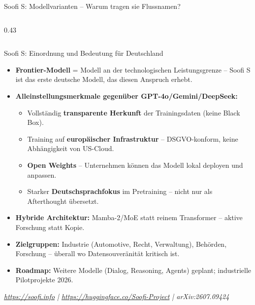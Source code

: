 \documentclass[aspectratio=1610, xcolor=dvipsnames, 9pt]{beamer}
\begin{document}
\begin{frame}{Soofi S: Modellvarianten -- Warum tragen sie Flussnamen?}
\begin{columns}
\begin{column}{0.43\textwidth}
    \end{column}
  \end{columns}
\end{frame}

\begin{frame}{Soofi S: Einordnung und Bedeutung für Deutschland}
  \begin{itemize}
    \item \textbf{Frontier-Modell} = Modell an der technologischen Leistungsgrenze -- Soofi S ist das erste deutsche Modell, das diesen Anspruch erhebt.
    \item \textbf{Alleinstellungsmerkmale gegenüber GPT-4o/Gemini/DeepSeek:}
      \begin{itemize}
        \item Vollständig \textbf{transparente Herkunft} der Trainingsdaten (keine Black Box).
        \item Training auf \textbf{europäischer Infrastruktur} -- DSGVO-konform, keine Abhängigkeit von US-Cloud.
        \item \textbf{Open Weights} -- Unternehmen können das Modell lokal deployen und anpassen.
        \item Starker \textbf{Deutschsprachfokus} im Pretraining -- nicht nur als Afterthought übersetzt.
      \end{itemize}
    \item \textbf{Hybride Architektur:} Mamba-2/MoE statt reinem Transformer -- aktive Forschung statt Kopie.
    \item \textbf{Zielgruppen:} Industrie (Automotive, Recht, Verwaltung), Behörden, Forschung -- überall wo Datensouveränität kritisch ist.
    \item \textbf{Roadmap:} Weitere Modelle (Dialog, Reasoning, Agents) geplant; industrielle Pilotprojekte 2026.
  \end{itemize}
  \begin{center}\footnotesize\textit{\url{https://soofi.info} | \url{https://huggingface.co/Soofi-Project} | arXiv:2607.09424}\end{center}
\end{frame}
\end{document}
